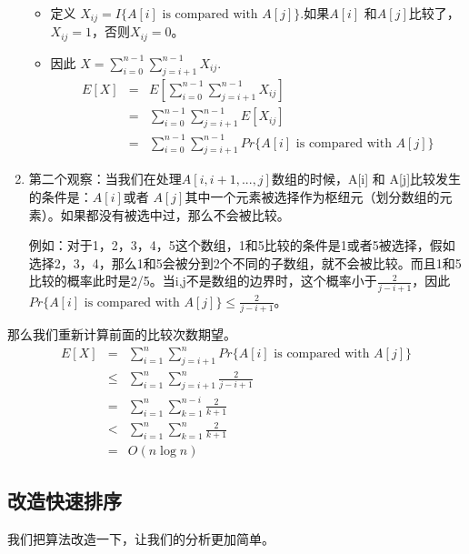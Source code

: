 \begin{enumerate}
\begin{figure}[H]
\end{figure}

\begin{itemize}

      \item 定义 $X_{ij} = I \{ A[i] \text{ is compared with } A[j] \}$.如果$A[i]$ 和$A[j]$比较了，$X_{ij}=1$，否则$X_{ij}=0$。
      \item 因此 $X = \sum_{i=0}^{n-1}\sum_{j=i+1}^{n-1} X_{ij}$. 
      \begin{eqnarray}
      E[ X ] & = &  E [\sum_{i=0}^{n-1}\sum_{j=i+1}^{n-1} X_{ij} ] \nonumber \\
              & = &   \sum_{i=0}^{n-1}\sum_{j=i+1}^{n-1} E[ X_{ij} ] \nonumber \\
              & = &   \sum_{i=0}^{n-1}\sum_{j=i+1}^{n-1} Pr\{ A[i]  \text{ is compared with } A[j]\}  \nonumber 
      \end{eqnarray} 

\end{itemize} 

\item
	第二个观察：当我们在处理$A[i, i+1, ... , j]$数组的时候，A[i] 和 A[j]比较发生的条件是：$A[i]$或者 $A[j]$其中一个元素被选择作为枢纽元（划分数组的元素）。如果都没有被选中过，那么不会被比较。

	例如：对于1，2，3，4，5这个数组，1和5比较的条件是1或者5被选择，假如选择2，3，4，那么1和5会被分到2个不同的子数组，就不会被比较。而且1和5比较的概率此时是2/5。当i,j不是数组的边界时，这个概率小于$\frac{2}{j-i+1}$，因此$Pr\{A[i]  \text{ is compared with } A[j]\}  \leq \frac{2}{j-i+1}$。

\end{enumerate}

	那么我们重新计算前面的比较次数期望。
 	\begin{eqnarray}
      E[ X ]        & = &   \sum\nolimits_{i=1}^{n}\sum\nolimits_{j=i+1}^n Pr\{ A[i]  \text{ is compared with } A[j]\}  \nonumber \\
      & \leq &  \sum\nolimits_{i=1}^{n}\sum\nolimits_{j=i+1}^n  \frac{2}{j-i+1} \nonumber \\ 
      & = & \sum\nolimits_{i=1}^n \sum\nolimits_{k=1}^{n-i} \frac{2}{k+1}  \nonumber \\        
      & < & \sum\nolimits_{i=1}^n \sum\nolimits_{k=1}^{n} \frac{2}{k+1} \nonumber \\
      & = & O( n \log n ) \nonumber 
      \end{eqnarray} 
\subsection{改造快速排序}
	我们把算法改造一下，让我们的分析更加简单。
	
